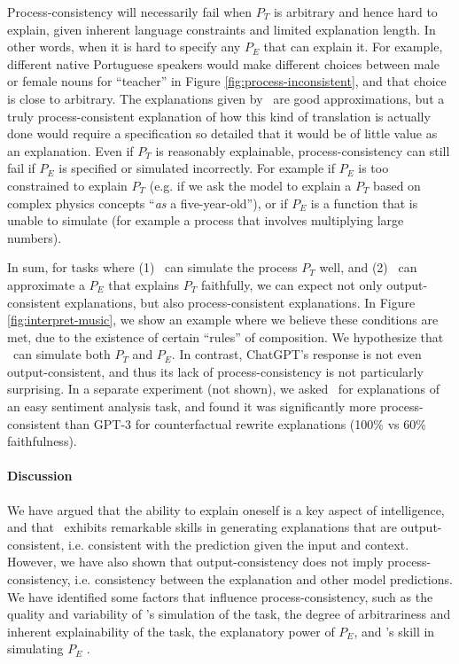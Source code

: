 Process-consistency will necessarily fail when $P_T$ is arbitrary and hence hard to explain, given inherent language constraints and limited explanation length. In other words, when it is hard to specify any $P_E$ that can explain it. For example, different native Portuguese speakers would make different choices between male or female nouns for ``teacher'' in Figure \ref{fig:process-inconsistent}, and that choice is close to arbitrary.
The explanations given by \DV\ are good approximations, but a truly process-consistent explanation of how this kind of translation is actually done would require a specification so detailed that it would be of little value as an explanation. Even if $P_T$ is reasonably explainable, process-consistency can still fail if  $P_E$  is specified or simulated incorrectly. For example if $P_E$ is too constrained to explain $P_T$ (e.g. if we ask the model to explain a $P_T$ based on complex physics concepts ``{\it as} a five-year-old''), or if $P_E$ is a function that {\DV} is unable to simulate (for example a process that involves multiplying large numbers).



In sum, for tasks where (1) \DV\ can simulate the process $P_T$ well, and (2) \DV\ can approximate a $P_E$ that explains $P_T$ faithfully, we can expect not only output-consistent explanations, but also process-consistent explanations.
In Figure \ref{fig:interpret-music}, we show an example where we believe these conditions are met, due to the existence of certain ``rules'' of composition. We hypothesize that \DV\ can simulate both $P_T$ and $P_E$.
In contrast, ChatGPT's response is not even output-consistent, and thus its lack of process-consistency is not particularly surprising. In a separate experiment (not shown), we asked \DV\ for explanations of an easy sentiment analysis task, and found it was significantly more process-consistent than GPT-3 for counterfactual rewrite explanations (100\% vs 60\% faithfulness).



\paragraph{Discussion}
We have argued that the ability to explain oneself is a key aspect of intelligence, and that \DV\ exhibits remarkable skills in generating explanations that are output-consistent, i.e. consistent with the prediction given the input and context.
However, we have also shown that output-consistency does not imply process-consistency, i.e. consistency between the explanation and other model predictions. 
We have identified some factors that influence process-consistency, such as the quality and variability of \DV's simulation of the task, the degree of arbitrariness and inherent explainability of the task, the explanatory power of $P_E$, and \DV's skill in simulating $P_E$ .
 


